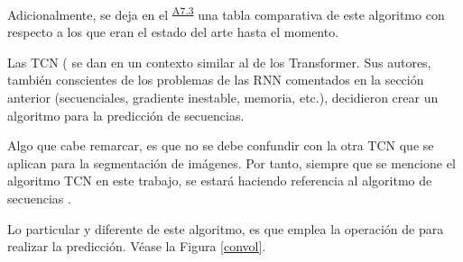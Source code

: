 {Adicionalmente, se deja en el \textsuperscript{\hyperref[ap:inf_res]{A7.3}} una tabla comparativa de este algoritmo con respecto a los que eran el estado del arte hasta el momento.



Las TCN ( \parencite{TCNSeq} se dan en un contexto similar al de los Transformer. Sus autores, también conscientes de los problemas de las RNN comentados  en la sección anterior (secuenciales,  gradiente inestable, memoria, etc.), decidieron crear un algoritmo para la predicción de secuencias\fnm. 

Algo que cabe remarcar, es que no se debe confundir con la otra TCN \parencite{TCNOrig} que se aplican para la segmentación de imágenes. Por tanto, siempre que se mencione el algoritmo TCN en este trabajo, se estará haciendo referencia al algoritmo de secuencias \parencite{TCNSeq}.

Lo particular y diferente de este algoritmo, es que emplea la operación de  para realizar la predicción. Véase la Figura \ref{convol}.

\begin{figure}[H]
    \centering
    \hspace*{-1cm}
\end{figure}}
